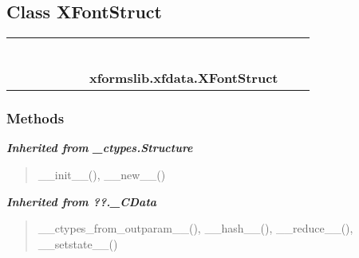 
\subsection{Class XFontStruct}

    \label{xformslib:xfdata:XFontStruct}
\begin{tabular}{cccccccccc}
\multicolumn{2}{r}{\settowidth{\BCL}{object}\multirow{2}{\BCL}{object}}
&&
&&
&&
  \\\cline{3-3}
  &&\multicolumn{1}{c|}{}
&&
&&
&&
  \\
\multicolumn{4}{r}{\settowidth{\BCL}{??.\_CData}\multirow{2}{\BCL}{??.\_CData}}
&&
&&
  \\\cline{5-5}
  &&&&\multicolumn{1}{c|}{}
&&
&&
  \\
\multicolumn{6}{r}{\settowidth{\BCL}{\_ctypes.Structure}\multirow{2}{\BCL}{\_ctypes.Structure}}
&&
  \\\cline{7-7}
  &&&&&&\multicolumn{1}{c|}{}
&&
  \\
&&&&&&\multicolumn{2}{l}{\textbf{xformslib.xfdata.XFontStruct}}
\end{tabular}



  \subsubsection{Methods}


\large{\textbf{\textit{Inherited from \_ctypes.Structure}}}

\begin{quote}
\_\_init\_\_(), \_\_new\_\_()
\end{quote}

\large{\textbf{\textit{Inherited from ??.\_CData}}}

\begin{quote}
\_\_ctypes\_from\_outparam\_\_(), \_\_hash\_\_(), \_\_reduce\_\_(), \_\_setstate\_\_()
\end{quote}

